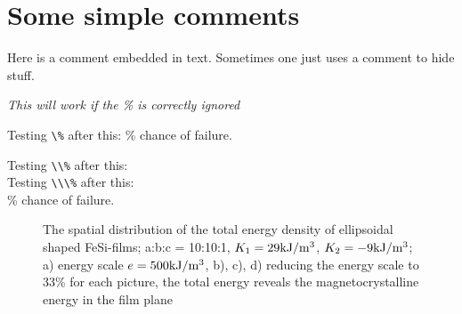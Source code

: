 \documentclass{article}
\begin{document}
\section{Some simple comments}
Here %
is a comment embedded in text.
Sometimes one just uses
a comment to hide stuff.

{\it This will work %
if the \% is correctly ignored}

Testing \verb#\%# after this: \% chance of failure.

Testing \verb#\\%# after this: \\%

Testing \verb#\\\%# after this: \\\% chance of failure.

\begin{figure}[ht]
\caption{\label{zoom}The spatial distribution of the total energy density of
ellipsoidal shaped FeSi-films; a:b:c = 10:10:1, $K_1 = 29\rm kJ/m^3$, $K_2 = -9 \rm kJ/m^3$;
a) energy scale $e = 500\rm kJ/m^3$,
b), c), d) reducing the energy scale to 33\% for each picture,
the total energy reveals the magnetocrystalline energy in the film
plane}
\end{figure}
\end{document}
